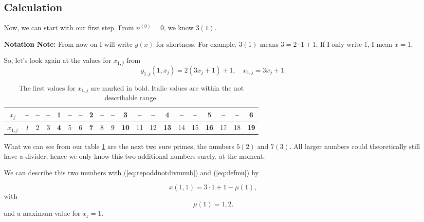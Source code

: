 \subsection{Calculation}
\label{ss:calcualtionstepn0_1}
Now, we can start with our first step. From $n^{\left(0\right)} = 0$, we know $3(1)$.

\vspace{0.3cm}
\textbf{Notation Note:} From now on I will write $y\left(x\right)$ for shortness. For example, $3(1)$ means $3 = 2\cdot 1 + 1$. If I only write $1$, I mean $x = 1$.

\vspace{0.3cm}
So, let's look again at the values for $x_{1,j}$ from 
\begin{equation}
	y_{1,j}\left(1,x_{j}\right) = 2\left(3x_{j} + 1\right) + 1, \quad x_{1,j} = 3x_{j} + 1.
\label{eq:stepn0_1_valuesfordiv3}
\end{equation}

\begin{table}[H]
\centering
\caption{The first values for $x_{1,j}$ are marked in bold. Italic values are within the not describable range.}
\begin{tabular}{c|ccccccccccccccccccc}
	$x_{j}$ & -- & -- & -- & 1 & -- & -- & 2 & --  & -- & 3 & -- & -- & 4 & -- & -- & 5 & -- & -- & 6 \\
\hline	$x_{1,j}$ & \textit{1} & 2 & 3 & \textbf{4} & 5 & 6 & \textbf{7} & 8 & 9 & \textbf{10} & 11 & 12 & \textbf{13} & 14 & 15 & \textbf{16} & 17 & 18 & \textbf{19}
\end{tabular}
\label{tab:stepn0_1_valuesfordiv3}
\end{table}

What we can see from our table \ref{tab:stepn0_1_valuesfordiv3} are the next two sure primes, the numbers $5(2)$ and $7(3)$. All larger numbers could theoretically still have a divider, hence we only know this two additional numbers surely, at the moment.

\vspace{0.3cm}
We can describe this two numbers with (\ref{eq:repoddnotdivnumb}) and (\ref{eq:defmu}) by

\begin{equation}
	x\left(1,1\right) = 3\cdot 1 + 1 - \mu\left(1\right),
\label{eq:stepn0_1_eqfordiv3res}
\end{equation}
with
\begin{equation}
	\mu\left(1\right) = 1,2.
\label{eq:stepn0_1_eqfordiv3res}
\end{equation}
and a maximum value for $x_{j} = 1$.
